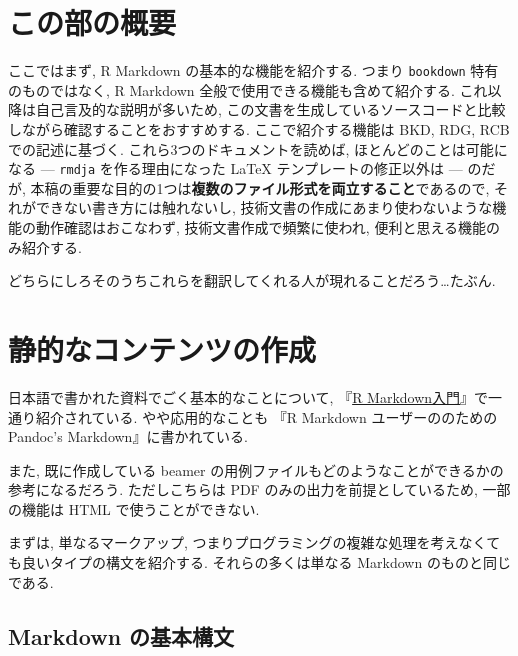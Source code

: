 \documentclass[
  nomag]{bxjsbook}
\theoremstyle{definition}
\theoremstyle{definition}
\theoremstyle{definition}
\theoremstyle{remark}
\begin{document}
\hypertarget{ux3053ux306eux90e8ux306eux6982ux8981}{%
\chapter*{この部の概要}\label{ux3053ux306eux90e8ux306eux6982ux8981}}

ここではまず, R Markdown の基本的な機能を紹介する. つまり
\texttt{bookdown} 特有のものではなく, R Markdown
全般で使用できる機能も含めて紹介する.
これ以降は自己言及的な説明が多いため,
この文書を生成しているソースコードと比較しながら確認することをおすすめする.
ここで紹介する機能は BKD, RDG, RCB での記述に基づく.
これら3つのドキュメントを読めば, ほとんどのことは可能になる ---
\texttt{rmdja} を作る理由になった LaTeX テンプレートの修正以外は ---
のだが,
本稿の重要な目的の1つは\textbf{複数のファイル形式を両立すること}であるので,
それができない書き方には触れないし,
技術文書の作成にあまり使わないような機能の動作確認はおこなわず,
技術文書作成で頻繁に使われ, 便利と思える機能のみ紹介する.

どちらにしろそのうちこれらを翻訳してくれる人が現れることだろう\ldots たぶん.

\hypertarget{ux9759ux7684ux306aux30b3ux30f3ux30c6ux30f3ux30c4ux306eux4f5cux6210}{%
\chapter{静的なコンテンツの作成}\label{ux9759ux7684ux306aux30b3ux30f3ux30c6ux30f3ux30c4ux306eux4f5cux6210}}

日本語で書かれた資料でごく基本的なことについて,
『\href{https://kazutan.github.io/kazutanR/Rmd_intro.html}{R
Markdown入門}』で一通り紹介されている. やや応用的なことも 『R Markdown
ユーザーののための Pandoc's Markdown』に書かれている.

また, 既に作成している beamer
の用例ファイルもどのようなことができるかの参考になるだろう.
ただしこちらは PDF のみの出力を前提としているため, 一部の機能は HTML
で使うことができない.

まずは, 単なるマークアップ,
つまりプログラミングの複雑な処理を考えなくても良いタイプの構文を紹介する.
それらの多くは単なる Markdown のものと同じである.

\hypertarget{markdown-ux306eux57faux672cux69cbux6587}{%
\section{Markdown
の基本構文}\label{markdown-ux306eux57faux672cux69cbux6587}}
\end{document}
